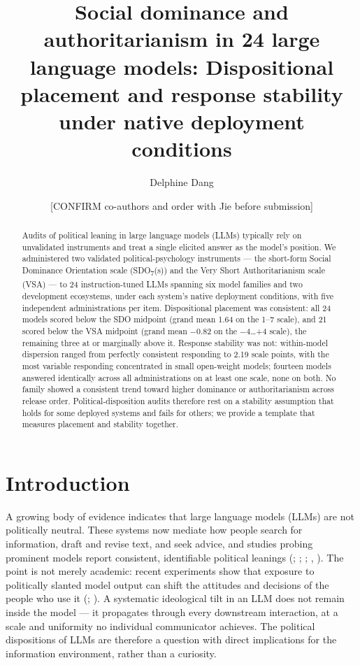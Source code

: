 \documentclass[
]{article}
\title{Social dominance and authoritarianism in 24 large language
models: Dispositional placement and response stability under native
deployment conditions}
\author{Delphine Dang \and {[}CONFIRM co-authors and order with Jie
before submission{]}}
\date{}
\newcounter{none} %
\begin{document}
\maketitle
\begin{abstract}
Audits of political leaning in large language models (LLMs) typically
rely on unvalidated instruments and treat a single elicited answer as
the model's position. We administered two validated political-psychology
instruments --- the short-form Social Dominance Orientation scale
(SDO\textsubscript{7}(s)) and the Very Short Authoritarianism scale
(VSA) --- to 24 instruction-tuned LLMs spanning six model families and
two development ecosystems, under each system's native deployment
conditions, with five independent administrations per item.
Dispositional placement was consistent: all 24 models scored below the
SDO midpoint (grand mean 1.64 on the 1--7 scale), and 21 scored below
the VSA midpoint (grand mean −0.82 on the −4\ldots+4 scale), the
remaining three at or marginally above it. Response stability was not:
within-model dispersion ranged from perfectly consistent responding to
2.19 scale points, with the most variable responding concentrated in
small open-weight models; fourteen models answered identically across
all administrations on at least one scale, none on both. No family
showed a consistent trend toward higher dominance or authoritarianism
across release order. Political-disposition audits therefore rest on a
stability assumption that holds for some deployed systems and fails for
others; we provide a template that measures placement and stability
together.
\end{abstract}


\section{Introduction}\label{introduction}

A growing body of evidence indicates that large language models (LLMs)
are not politically neutral. These systems now mediate how people search
for information, draft and revise text, and seek advice, and studies
probing prominent models report consistent, identifiable political
leanings (;
;
;
,
). The point is not merely academic:
recent experiments show that exposure to politically slanted model
output can shift the attitudes and decisions of the people who use it
(;
). A systematic
ideological tilt in an LLM does not remain inside the model --- it
propagates through every downstream interaction, at a scale and
uniformity no individual communicator achieves. The political
dispositions of LLMs are therefore a question with direct implications
for the information environment, rather than a curiosity.
\end{document}
